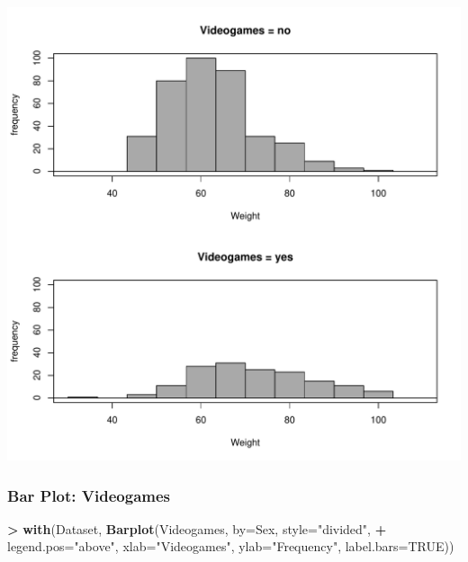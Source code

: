 \documentclass[
]{article}
\newenvironment{Shaded}{\begin{snugshade}}{\end{snugshade}}
\newcommand{\AttributeTok}[1]{\textcolor[rgb]{0.13,0.29,0.53}{#1}}
\newcommand{\ConstantTok}[1]{\textcolor[rgb]{0.56,0.35,0.01}{#1}}
\newcommand{\FunctionTok}[1]{\textcolor[rgb]{0.13,0.29,0.53}{\textbf{#1}}}
\newcommand{\NormalTok}[1]{#1}
\newcommand{\SpecialCharTok}[1]{\textcolor[rgb]{0.81,0.36,0.00}{\textbf{#1}}}
\newcommand{\StringTok}[1]{\textcolor[rgb]{0.31,0.60,0.02}{#1}}
\begin{document}
\includegraphics[width=750px]{RcmdrMarkdown_files/figure-latex/unnamed-chunk-13-1}

\subsubsection{Bar Plot: Videogames}\label{bar-plot-videogames}

\begin{Shaded}
\begin{Highlighting}[]
\SpecialCharTok{\textgreater{}} \FunctionTok{with}\NormalTok{(Dataset, }\FunctionTok{Barplot}\NormalTok{(Videogames, }\AttributeTok{by=}\NormalTok{Sex, }\AttributeTok{style=}\StringTok{"divided"}\NormalTok{, }
\SpecialCharTok{+}   \AttributeTok{legend.pos=}\StringTok{"above"}\NormalTok{, }\AttributeTok{xlab=}\StringTok{"Videogames"}\NormalTok{, }\AttributeTok{ylab=}\StringTok{"Frequency"}\NormalTok{, }\AttributeTok{label.bars=}\ConstantTok{TRUE}\NormalTok{))}
\end{Highlighting}
\end{Shaded}
\end{document}
